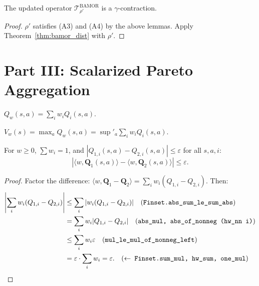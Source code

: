 \begin{corollary}
\label{cor:post_update}
The updated operator $\mathcal{T}^{\mathrm{BAMOR}}_{\rho'}$ is a $\gamma$-contraction.
\end{corollary}
\begin{proof}
$\rho'$ satisfies (A3) and (A4) by the above lemmas.  Apply Theorem~\ref{thm:bamor_dist} with $\rho' $.
\end{proof}


\section{Part III: Scalarized Pareto Aggregation}
\label{app:scalarize}

\begin{definition}
$Q_w(s,a) = \sum_i w_i Q_i(s,a)$.
\end{definition}

\begin{definition}
$V_w(s) = \max_a Q_w(s,a) = \sup'_a \sum_i w_i Q_i(s,a)$.
\end{definition}

\begin{lemma}
\label{lem:scalarize_nonexp}
For $w \ge 0$, $\sum w_i = 1$, and $|Q_{1,i}(s,a) - Q_{2,i}(s,a)| \le \varepsilon$ for all $s,a,i$:
\begin{equation}
    |\langle w, \mathbf{Q}_1(s,a) \rangle - \langle w, \mathbf{Q}_2(s,a) \rangle| \le \varepsilon.
\end{equation}
\end{lemma}
\begin{proof}
Factor the difference: $\langle w, \mathbf{Q}_1 - \mathbf{Q}_2 \rangle = \sum_i w_i(Q_{1,i} - Q_{2,i})$.  Then:
\begin{align}
    \left|\sum_i w_i(Q_{1,i} - Q_{2,i})\right| &\le \sum_i |w_i(Q_{1,i} - Q_{2,i})| \quad \text{(\texttt{Finset.abs\_sum\_le\_sum\_abs})} \\
    &= \sum_i w_i |Q_{1,i} - Q_{2,i}| \quad \text{(\texttt{abs\_mul, abs\_of\_nonneg (hw\_nn i)})} \\
    &\le \sum_i w_i \varepsilon \quad \text{(\texttt{mul\_le\_mul\_of\_nonneg\_left})} \\
    &= \varepsilon \cdot \sum_i w_i = \varepsilon. \quad \text{(\texttt{$\leftarrow$ Finset.sum\_mul, hw\_sum, one\_mul})}
\end{align}
\end{proof}


